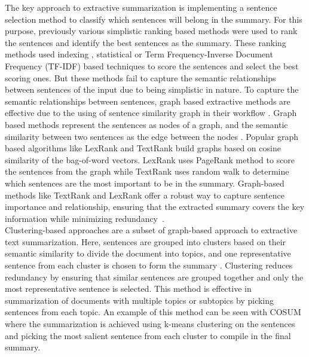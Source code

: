 The key approach to extractive summarization is implementing a sentence selection method to classify which sentences will belong in the summary. For this purpose, previously various simplistic ranking based methods were used to rank the sentences and identify the best sentences as the summary. These ranking methods used indexing \cite{Baxendale_1958_firstsummarization}, statistical \cite{edmundson_1969_earlysum} or Term Frequency-Inverse Document Frequency (TF-IDF) \cite{das-2022-tfidf,sarkar-2012-tfidf-2,sarkar-2012-tfidf} based techniques to score the sentences and  select the best scoring ones. But these methods fail to capture the semantic relationships between sentences of the input due to being simplistic in nature. To capture the semantic relationships between sentences, graph based extractive methods are effective due to the using of sentence similarity graph in their workflow \cite{wafaa-2021-summary-comprehensive-review}. Graph based methods represent the sentences as nodes of a graph, and the semantic similarity between two sentences as the edge between the nodes \cite{moratanch-2017-extractive-review}. Popular graph based algorithms like LexRank \cite{Erkan-lexRank-2004} and TextRank \cite{mihalcea-2004-textrank} build graphs based on cosine similarity of the bag-of-word vectors. LexRank uses PageRank \cite{page-PageRank-1999} method to score the sentences from the graph while TextRank uses random walk to determine which sentences are the most important to be in the summary. Graph-based methods like TextRank and LexRank offer a robust way to capture sentence importance and relationship, ensuring that the extracted summary covers the key information while minimizing redundancy~\cite{wafaa-2021-summary-comprehensive-review}.\\  

Clustering-based approaches are a subset of graph-based approach to extractive text summarization. Here, sentences are grouped into clusters based on their semantic similarity to divide the document into topics, and one representative sentence from each cluster is chosen to form the summary \cite{Mohan-2022-topic-modeling-rev-clustering}. Clustering reduces redundancy by ensuring that similar sentences are grouped together and only the most representative sentence is selected. This method is effective in summarization of documents with multiple topics or subtopics by picking sentences from each topic. An example of this method can be seen with COSUM \cite{alguliyev-2019-cosum} where the summarization is achieved using k-means clustering on the sentences and picking the most salient sentence from each cluster to compile in the final summary.\\

